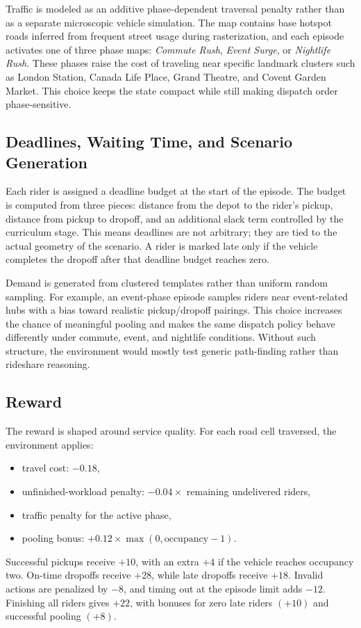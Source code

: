 \documentclass{article}
\begin{document}
Traffic is modeled as an additive phase-dependent traversal penalty rather than as a separate microscopic vehicle simulation. The map contains base hotspot roads inferred from frequent street usage during rasterization, and each episode activates one of three phase maps: \emph{Commute Rush}, \emph{Event Surge}, or \emph{Nightlife Rush}. These phases raise the cost of traveling near specific landmark clusters such as London Station, Canada Life Place, Grand Theatre, and Covent Garden Market. This choice keeps the state compact while still making dispatch order phase-sensitive.

\subsection{Deadlines, Waiting Time, and Scenario Generation}
Each rider is assigned a deadline budget at the start of the episode. The budget is computed from three pieces: distance from the depot to the rider's pickup, distance from pickup to dropoff, and an additional slack term controlled by the curriculum stage. This means deadlines are not arbitrary; they are tied to the actual geometry of the scenario. A rider is marked late only if the vehicle completes the dropoff after that deadline budget reaches zero.

Demand is generated from clustered templates rather than uniform random sampling. For example, an event-phase episode samples riders near event-related hubs with a bias toward realistic pickup/dropoff pairings. This choice increases the chance of meaningful pooling and makes the same dispatch policy behave differently under commute, event, and nightlife conditions. Without such structure, the environment would mostly test generic path-finding rather than rideshare reasoning.

\subsection{Reward}
The reward is shaped around service quality. For each road cell traversed, the environment applies:
\begin{itemize}
    \item travel cost: \(-0.18\),
    \item unfinished-workload penalty: \(-0.04 \times\) remaining undelivered riders,
    \item traffic penalty for the active phase,
    \item pooling bonus: \(+0.12 \times \max(0,\text{occupancy}-1)\).
\end{itemize}
Successful pickups receive \(+10\), with an extra \(+4\) if the vehicle reaches occupancy two. On-time dropoffs receive \(+28\), while late dropoffs receive \(+18\). Invalid actions are penalized by \(-8\), and timing out at the episode limit adds \(-12\). Finishing all riders gives \(+22\), with bonuses for zero late riders \((+10)\) and successful pooling \((+8)\).
\end{document}

